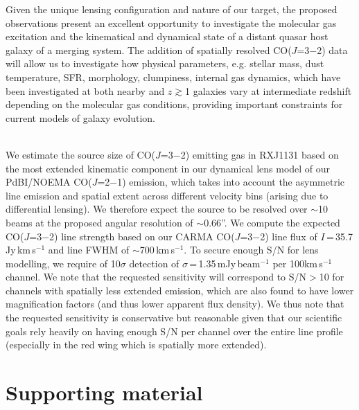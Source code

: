 \documentclass[11pt,a4paper,twoside,graphicx,color]{article}
\newcommand{\bco}{\mbox{CO($J$=2$-$1)}\xspace}
\newcommand{\cco}{\mbox{CO($J$=3$-$2)}\xspace}
\newcommand{\kms}{km\,s$^{-1}$\xspace}
\newcommand{\pmOne}{\mbox{$^{-1}$}\xspace}
\newcommand{\eq}{\,=\,}
\newcommand{\atinterz}{at intermediate redshift\xspace}
\begin{document}
Given the unique lensing configuration and nature of our target, the proposed observations 
present an excellent opportunity to investigate the molecular gas excitation
and the kinematical and dynamical 
state of a distant quasar host galaxy of a merging system.
The addition of spatially resolved \cco data will allow 
us to investigate how physical parameters, e.g. stellar mass, dust temperature, SFR, morphology, clumpiness, internal gas dynamics, which have been investigated at both nearby and $z$$\gtrsim$1 galaxies vary \atinterz depending on the molecular gas conditions, providing important constraints for current models of galaxy evolution.

\vspace{.5em}
 \\
\indent We estimate the source size of \cco emitting gas in RXJ1131 based on the
most extended kinematic component in our dynamical lens model of our PdBI/NOEMA \bco emission, which takes into account the asymmetric line emission and spatial extent across different velocity bins (arising due to differential lensing).
We therefore expect the source to be resolved over $\sim$10 beams at the proposed angular resolution of $\sim$0.66''.
We compute the expected \cco line strength based on our 
CARMA \cco line flux of $I$\eq35.7\,Jy\,\kms and line FWHM of $\sim$700\,\kms.
To secure enough S/N for lens modelling, 
we require of 10$\sigma$ detection of $\sigma$\eq1.35\,mJy\,beam\pmOne per 100\kms channel.
We note that the requested sensitivity will correspond to S/N$>$10 for channels with spatially less extended emission, which are also found to have lower magnification factors (and thus lower apparent flux density). 
We thus note that the requested sensitivity is conservative but reasonable given that our scientific goals rely heavily on having enough S/N per channel over the entire line profile (especially in the red wing which is spatially more extended).

\clearpage
\section{Supporting material} %
\end{document}
